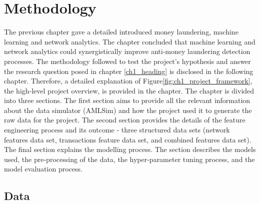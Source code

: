 %
%

\chapter{Methodology} \label{ch3_heading}

The previous chapter gave a detailed introduced money laundering, machine learning and network analytics. The chapter concluded that machine learning and network analytics could synergistically improve anti-money laundering detection processes. The methodology followed to test the project's hypothesis and answer the research question posed in chapter \ref{ch1_heading} is disclosed in the following chapter. Therefore, a detailed explanation of Figure\ref{fig:ch1_project_framework}, the high-level project overview, is provided in the chapter. The chapter is divided into three sections. The first section aims to provide all the relevant information about the data simulator (AMLSim) and how the project used it to generate the raw data for the project. The second section provides the details of the feature engineering process and its outcome - three structured data sets (network features data set, transactions feature data set, and combined features data set). The final section explains the modelling process. The section describes the models used, the pre-processing of the data, the hyper-parameter tuning process, and the model evaluation process.

\section{Data} \label{ch3_sub_heading_data}

